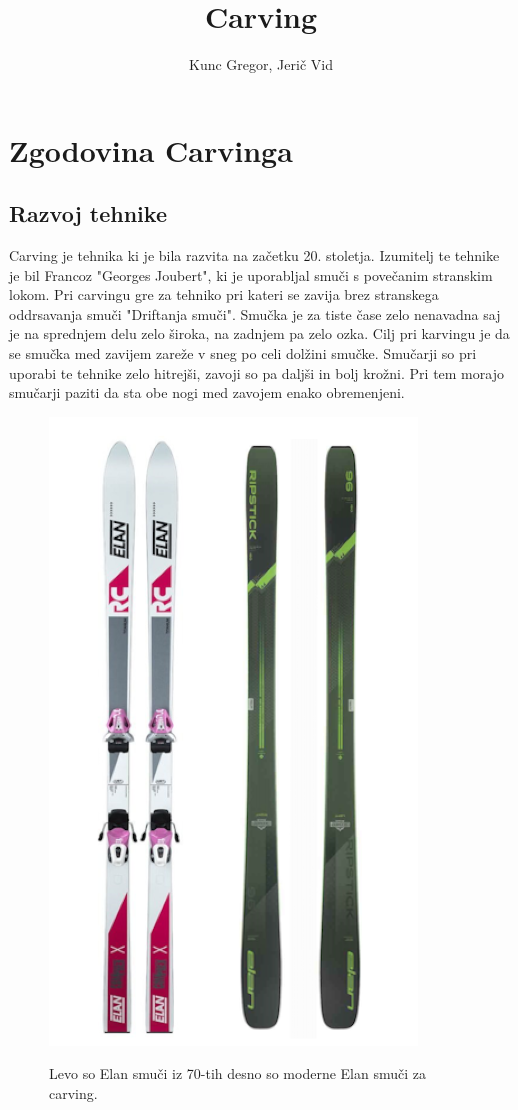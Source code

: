 \documentclass{article}
\title{Carving}
\author{Kunc Gregor, Jerič Vid}
\begin{document}
\maketitle

\section{Zgodovina Carvinga}

\subsection*{Razvoj tehnike}
Carving je tehnika ki je bila razvita na začetku 20. stoletja. Izumitelj te tehnike je bil Francoz "Georges Joubert", ki je uporabljal smuči s povečanim stranskim lokom.
Pri carvingu gre za tehniko pri kateri se zavija brez stranskega oddrsavanja smuči "Driftanja smuči".
Smučka je za tiste čase zelo nenavadna saj je na sprednjem delu zelo široka, na zadnjem pa zelo ozka.
Cilj pri karvingu je da se smučka med zavijem zareže v sneg po celi dolžini smučke. Smučarji so pri uporabi te tehnike zelo hitrejši, zavoji so pa daljši in bolj krožni. 
Pri tem morajo smučarji paziti da sta obe nogi med zavojem enako obremenjeni. 

\begin{figure}
    \centering
    \includegraphics[scale=0.3]{../images/elan smuci.png} \\
    \caption[short]{Levo so Elan smuči iz 70-tih desno so moderne Elan smuči za carving.}
    \label{fig:slika1}
\end{figure}
\end{document}
